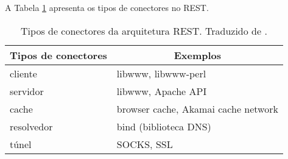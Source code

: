     A Tabela \ref{rest-connectors-elements} apresenta os tipos de conectores no REST.
    
    \begin{table}[ht!]
    \centering
    \caption{Tipos de conectores da arquitetura REST. Traduzido de \cite{fielding2002}.}
    \label{rest-connectors-elements}
    \begin{tabular}{l|l}
    \hline
    \multicolumn{1}{c|}{\textbf{Tipos de conectores}} & \multicolumn{1}{c}{\textbf{Exemplos}} \\ \hline
    cliente                                            & libwww, libwww-perl                    \\ \hline
    servidor                                           & libwww, Apache API                     \\ \hline
    cache                                              & browser cache, Akamai cache network    \\ \hline
    resolvedor                                         & bind (biblioteca DNS)                  \\ \hline
    túnel                                              & SOCKS, SSL                             \\ \hline
    \end{tabular}
    \end{table}




